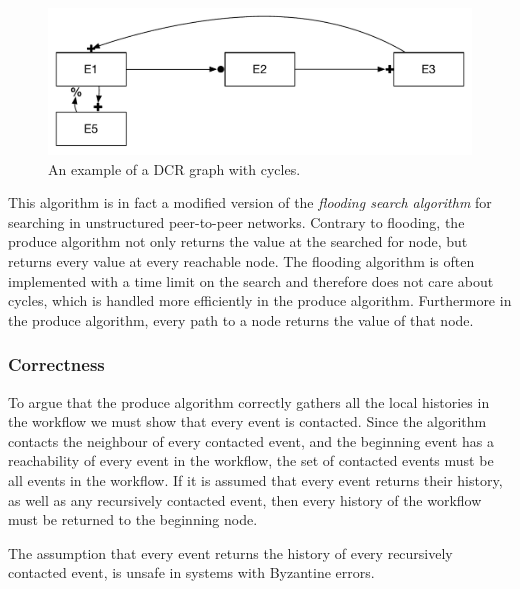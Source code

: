 	\begin{figure}[H]
		\centering
		\includegraphics[height=0.15\textheight]{4connect/images/dcr-graph-cycle.pdf}
		\caption{An example of a DCR graph with cycles.}
		\label{fig:connecting:dcr-graph-cycle}
	\end{figure}
		
	\newpar This algorithm is in fact a modified version of the \textit{flooding search algorithm}  for searching in unstructured peer-to-peer networks. Contrary to flooding, the produce algorithm not only returns the value at the searched for node, but returns every value at every reachable node. The flooding algorithm is often implemented with a time limit on the search and therefore does not care about cycles, which is handled more efficiently in the produce algorithm. Furthermore in the produce algorithm, every path to a node returns the value of that node.
	
	\subsubsection{Correctness}
	To argue that the produce algorithm correctly gathers all the local histories in the workflow we must show that every event is contacted. Since the algorithm contacts the neighbour of every contacted event, and the beginning event has a reachability of every event in the workflow, the set of contacted events must be all events in the workflow. If it is assumed that every event returns their history, as well as any recursively contacted event, then every history of the workflow must be returned to the beginning node. 
	
	The assumption that every event returns the history of every recursively contacted event, is unsafe in systems with Byzantine errors.
	
